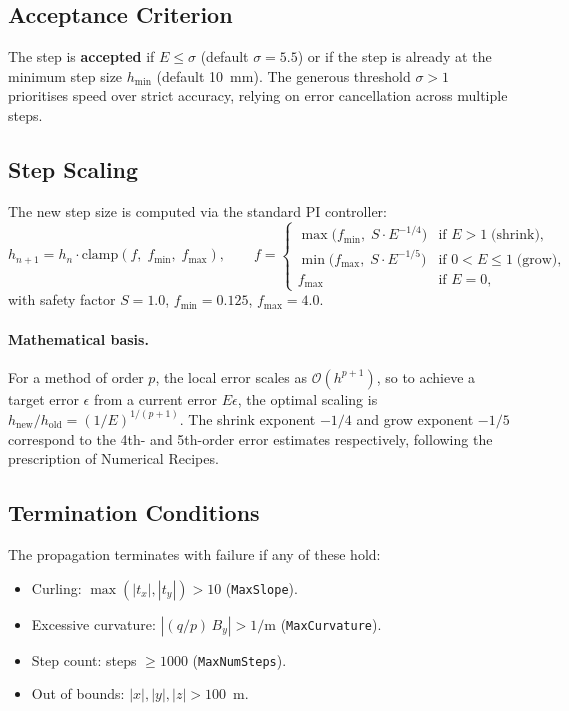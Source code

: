 \documentclass[11pt,a4paper]{article}
\newcommand{\qop}{q/p}
\begin{document}
\subsection{Acceptance Criterion}

The step is \textbf{accepted} if $E \leq \sigma$ (default $\sigma=5.5$) or if
the step is already at the minimum step size $h_\text{min}$ (default 10~mm).
The generous threshold $\sigma > 1$ prioritises speed over strict accuracy,
relying on error cancellation across multiple steps.

\subsection{Step Scaling}

The new step size is computed via the standard PI controller:
\begin{equation}
  h_{n+1} = h_n \cdot \text{clamp}\!\left(f,\; f_\text{min},\; f_\text{max}\right),
  \qquad
  f = \begin{cases}
    \max\!\bigl(f_\text{min},\; S \cdot E^{-1/4}\bigr) & \text{if } E > 1 \;\text{(shrink)}, \\[3pt]
    \min\!\bigl(f_\text{max},\; S \cdot E^{-1/5}\bigr) & \text{if } 0 < E \leq 1 \;\text{(grow)}, \\[3pt]
    f_\text{max} & \text{if } E = 0,
  \end{cases}
\end{equation}
with safety factor $S=1.0$, $f_\text{min}=0.125$, $f_\text{max}=4.0$.

\paragraph{Mathematical basis.} For a method of order $p$, the local error
scales as $\mathcal{O}(h^{p+1})$, so to achieve a target error $\epsilon$
from a current error $E\epsilon$, the optimal scaling is
$h_\text{new}/h_\text{old} = (1/E)^{1/(p+1)}$. The shrink exponent $-1/4$
and grow exponent $-1/5$ correspond to the 4th- and 5th-order error estimates
respectively, following the prescription of Numerical Recipes.

\subsection{Termination Conditions}

The propagation terminates with failure if any of these hold:
\begin{itemize}[nosep]
  \item Curling: $\max(|t_x|, |t_y|) > 10$ (\texttt{MaxSlope}).
  \item Excessive curvature: $|(\qop)\,B_y| > 1/\text{m}$ (\texttt{MaxCurvature}).
  \item Step count: steps $\geq 1000$ (\texttt{MaxNumSteps}).
  \item Out of bounds: $|x|,|y|,|z| > 100$~m.
\end{itemize}
\end{document}
